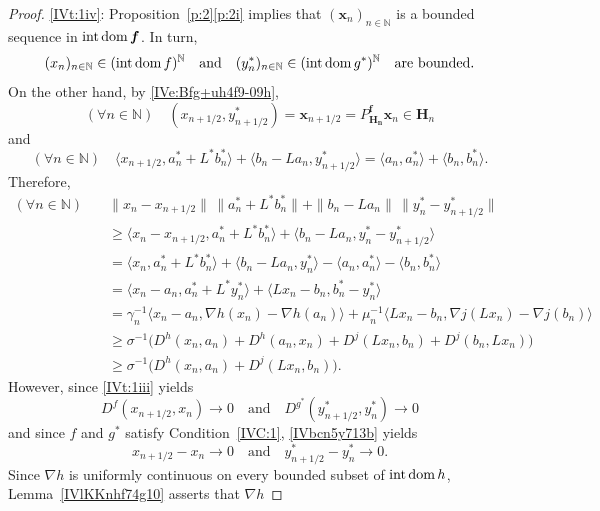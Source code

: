 \documentclass[a4paper,11pt,fleqn]{article}
\renewcommand{\geq}{\ensuremath{\geqslant}}
\newcommand{\pair}[2]{\langle{{#1},{#2}}\rangle}
\newcommand{\NN}{\ensuremath{\mathbb N}}
\newcommand{\intdom}{\ensuremath{\text{\rm int\,dom}\,}}
\theoremstyle{plain}{\theorembodyfont{\rmfamily}%
\newtheorem{conjecture}[theorem]{Conjecture}}
\theoremstyle{plain}{\theorembodyfont{\rmfamily}%
\newtheorem{example}[theorem]{Example}}
\theoremstyle{plain}{\theorembodyfont{\rmfamily}%
\newtheorem{remark}[theorem]{Remark}}
\theoremstyle{plain}{\theorembodyfont{\rmfamily}%
\newtheorem{algorithm}[theorem]{Algorithm}}
\theoremstyle{plain}{\theorembodyfont{\rmfamily}%
\newtheorem{condition}[theorem]{Condition}}
\theoremstyle{plain}{\theorembodyfont{\rmfamily}%
\newtheorem{definition}[theorem]{Definition}}
\theoremstyle{plain}{\theorembodyfont{\rmfamily}
\newtheorem{problem}[theorem]{Problem}}
\theoremstyle{plain}{\theorembodyfont{\rmfamily}
\newtheorem{notation}[theorem]{Notation}}
\numberwithin{equation}{section}
\begin{document}
\begin{proof}
\ref{IVt:1iv}: 
Proposition~\ref{p:2}\ref{p:2i} implies that
$(\boldsymbol{x}_n)_{n\in\NN}$ is a bounded sequence 
in $\intdom\boldsymbol{f}$. In turn, 
\begin{equation}
\label{eKKnhf74g15a}
(x_n)_{n\in\NN}\in(\intdom f)^{\NN}\quad\text{and}\quad
(y^*_n)_{n\in\NN}\in(\intdom g^*)^{\NN}\quad\text{are bounded}.
\end{equation}
On the other hand, by \eqref{IVe:Bfg+uh4f9-09h},
\begin{equation}
\label{IWeQA8h33-31a}
(\forall n\in\NN)\quad
(x_{n+1/2},y_{n+1/2}^*)=
\boldsymbol{x}_{n+1/2}=P_{\boldsymbol{H_n}}^{\boldsymbol{f}}
\boldsymbol{x}_n\in\boldsymbol{H}_n
\end{equation}
and
\begin{equation}
\label{IVe:IV8}
(\forall n\in\NN)\quad\pair{x_{n+1/2}}{a_n^*+L^*b_n^*}
+\pair{b_n-La_n}{y_{n+1/2}^*}
=\pair{a_n}{a_n^*}+\pair{b_n}{b_n^*}.
\end{equation}
Therefore,
\begin{align}
\label{IVe:8re84}
(\forall n\in\NN)\quad
&\|x_n-x_{n+1/2}\|\,\|a_n^*+L^*b_n^*\|
+\|b_n-La_n\|\,\|y_n^*-y_{n+1/2}^*\|\nonumber\\
&\geq\pair{x_n-x_{n+1/2}}{a_n^*+L^*b_n^*}
+\pair{b_n-La_n}{y_n^*-y_{n+1/2}^*}\nonumber\\
&=\pair{x_n}{a_n^*+L^*b_n^*}
+\pair{b_n-La_n}{y_n^*}
-\pair{a_n}{a_n^*}-\pair{b_n}{b_n^*}\nonumber\\
&=\pair{x_n-a_n}{a_n^*+L^*y_n^*}
+\pair{Lx_n-b_n}{b_n^*-y_n^*}\nonumber\\
&=\gamma_n^{-1}\pair{x_n-a_n}{\nabla h(x_n)
-\nabla h(a_n)}+\mu_n^{-1}
\pair{Lx_n-b_n}{\nabla j(Lx_n)-\nabla j(b_n)}
\nonumber\\
&\geq\sigma^{-1}\big(D^h(x_n,a_n)+D^h(a_n,x_n)
+D^j(Lx_n,b_n)+D^j(b_n,Lx_n)\big)\nonumber\\
&\geq\sigma^{-1}\big(D^h(x_n,a_n)+D^j(Lx_n,b_n)\big).
\end{align}
However, since \ref{IVt:1iii} yields
\begin{equation}
\label{IVe:IV4}
D^f(x_{n+1/2},x_n)\to 0
\quad\text{and}\quad
D^{g^*}(y_{n+1/2}^*,y_n^*)\to 0
\end{equation}
and since $f$ and $g^*$ satisfy Condition~\ref{IVC:1}, 
\eqref{IVbcn5y713b} yields
\begin{equation}
\label{IVe:IV5}
x_{n+1/2}-x_n\to 0
\quad\text{and}\quad
y_{n+1/2}^*-y_n^*\to 0.
\end{equation}
Since $\nabla h$ is uniformly continuous on every bounded subset of 
$\intdom h$, Lemma~\ref{IVlKKnhf74g10} asserts that $\nabla h$ 

\end{proof}
\end{document}
